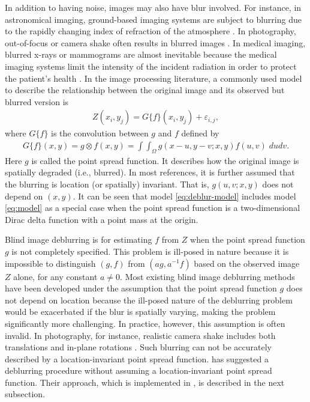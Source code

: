 In addition to having noise, images may also have blur involved. For instance, in astronomical imaging, ground-based imaging systems are subject to blurring due to the rapidly changing index of refraction of the atmosphere \citep{krist1995simulation, schulz1993multiframe}. In photography, out-of-focus or camera shake often results in blurred images \citep{fergus2006removing}. In medical imaging, blurred x-rays or mammograms are almost inevitable because the medical imaging systems limit the intensity of the incident radiation in order to protect the patient's health \citep{faulkner1989veiling}. In the image processing literature, a commonly used model to describe the relationship between the original image and its observed but blurred version is
\begin{align}
  \label{eq:deblur-model}
  Z(x_i, y_j) = G\{f\}(x_i, y_j) + \varepsilon_{i, j}, 
\end{align}
where \(G\{f\}\) is the convolution between \(g\) and \(f\) defined by
\begin{align*}
  G\{f\}(x,y) = g\otimes f(x, y) = \int\int_\Omega g(x-u,y-v; x, y) f(u,v)\; dudv.
\end{align*}
Here \(g\) is called the point spread function. It describes how the original image is spatially degraded (i.e., blurred). In most references, it is further assumed that the blurring is location (or spatially) invariant. That is, \(g(u, v;x, y)\) does not depend on \((x, y)\). It can be seen that model \eqref{eq:deblur-model} includes model \eqref{eq:model} as a special case when the point spread function is a two-dimensional Dirac delta function with a point mass at the origin.

Blind image deblurring is for estimating \(f\) from \(Z\) when the point spread function \(g\) is not completely specified. This problem is ill-posed in nature because it is impossible to distinguish \((g,f)\) from \((ag, a^{-1}f)\) based on the observed image \(Z\) alone, for any constant \(a\neq 0\). Most existing blind image deblurring methods have been developed under the assumption that the point spread function \(g\) does not depend on location because the ill-posed nature of the deblurring problem would be exacerbated if the blur is spatially varying, making the problem significantly more challenging. In practice, however, this assumption is often invalid. In photography, for instance, realistic camera shake includes both translations and in-plane rotations \citep{levin2011understanding}. Such blurring can not be accurately described by a location-invariant point spread function. \citet{kang2020consistent} has suggested a deblurring procedure without assuming a location-invariant point spread function. Their approach, which is implemented in , is described in the next subsection.

